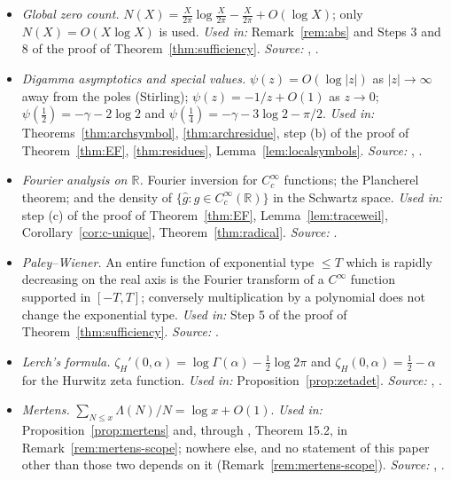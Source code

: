 \documentclass[11pt]{amsart}
\theoremstyle{definition}
\theoremstyle{remark}
\newcommand{\R}{\mathbb R}
\begin{document}
\begin{itemize}
\item[\textbf{(E3d)}] \emph{Global zero count.}
$N(X)=\frac{X}{2\pi}\log\frac X{2\pi}-\frac X{2\pi}+O(\log X)$; only
$N(X)=O(X\log X)$ is used.  \emph{Used in:} Remark~\ref{rem:abs} and Steps 3
and 8 of the proof of Theorem~\ref{thm:sufficiency}.
\emph{Source:} \cite[ch.~15]{Davenport}, \cite[\S5.1]{IK}.

\item[\textbf{(E4)}] \emph{Digamma asymptotics and special values.}
$\psi(z)=O(\log|z|)$ as $|z|\to\infty$ away from the poles (Stirling);
$\psi(z)=-1/z+O(1)$ as $z\to0$; $\psi(\tfrac12)=-\gamma-2\log2$ and
$\psi(\tfrac14)=-\gamma-3\log2-\pi/2$.  \emph{Used in:}
Theorems~\ref{thm:archsymbol}, \ref{thm:archresidue},
step (b) of the proof of Theorem~\ref{thm:EF}, \ref{thm:residues}, Lemma~\ref{lem:localsymbols}.
\emph{Source:} \cite[ch.~5]{NIST}, \cite[ch.~12]{WW}.

\item[\textbf{(E5)}] \emph{Fourier analysis on $\R$.}  Fourier inversion for
$C_c^\infty$ functions; the Plancherel theorem; and the density of
$\{\hat g: g\in C_c^\infty(\R)\}$ in the Schwartz space.  \emph{Used in:}
step (c) of the proof of Theorem~\ref{thm:EF}, Lemma~\ref{lem:traceweil},
Corollary~\ref{cor:c-unique}, Theorem~\ref{thm:radical}.
\emph{Source:} \cite[ch.~7]{Hormander}.

\item[\textbf{(E6)}] \emph{Paley--Wiener.}  An entire function of exponential
type $\le T$ which is rapidly decreasing on the real axis is the Fourier
transform of a $C^\infty$ function supported in $[-T,T]$; conversely
multiplication by a polynomial does not change the exponential type.
\emph{Used in:} Step 5 of the proof of Theorem~\ref{thm:sufficiency}.
\emph{Source:} \cite[Theorem 7.3.1]{Hormander}.

\item[\textbf{(E7)}] \emph{Lerch's formula.}
$\zeta_H'(0,\alpha)=\log\Gamma(\alpha)-\tfrac12\log2\pi$ and
$\zeta_H(0,\alpha)=\tfrac12-\alpha$ for the Hurwitz zeta function.
\emph{Used in:} Proposition~\ref{prop:zetadet}.
\emph{Source:} \cite[\S13.21]{WW}, \cite[ch.~25]{NIST}.

\item[\textbf{(E8)}] \emph{Mertens.}
$\sum_{N\le x}\Lambda(N)/N=\log x+O(1)$.  \emph{Used in:}
Proposition~\ref{prop:mertens} and, through \cite{P43}, Theorem 15.2, in
Remark~\ref{rem:mertens-scope}; nowhere else, and no statement of this paper
other than those two depends on it (Remark~\ref{rem:mertens-scope}).
\emph{Source:} \cite[\S2.2]{IK}, \cite[ch.~7]{Davenport}.
\end{itemize}
\end{document}
